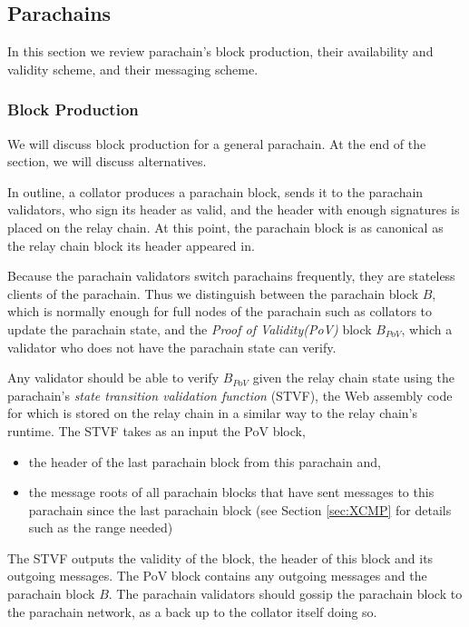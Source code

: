 \subsection{Parachains}\label{sec:parachains}
In this section we review parachain's block production, their availability and validity scheme, and their messaging scheme.
\subsubsection{Block Production}\label{sec:parachainblockproduction}

We will discuss block production for a general parachain. At the end of the section, we will discuss alternatives.

In outline, a collator produces a parachain block, sends it to the parachain validators,
who sign its header as valid, and the header with enough signatures is placed on the relay chain.
At this point, the parachain block is as canonical as the relay chain block its header appeared in.

Because the parachain validators switch parachains frequently, they are stateless clients of the parachain.
Thus we distinguish between the parachain block $B$, which is normally enough for full nodes of the parachain such as collators to update the parachain state,
and the {\em Proof of Validity(PoV)} block $B_{PoV}$, which a validator who does not have the parachain state can verify.

Any validator should be able to verify $B_{PoV}$ given the relay chain state using the parachain's {\em state transition validation function} (STVF),
the Web assembly code for which is stored on the relay chain in a similar way to the relay chain's runtime.
The STVF takes as an input the PoV block,
\begin{itemize}
	\item  the header of the last parachain block from this parachain and,
	\item the message roots of all parachain blocks that have sent messages to this parachain since the last parachain block
	(see Section \ref{sec:XCMP} for details such as the range needed)
\end{itemize}
The STVF outputs the validity of the block, the header of this block and its outgoing messages.
The PoV block contains any outgoing messages and the parachain block $B$. The parachain validators should gossip the parachain block to the parachain network, as a back up to the collator itself doing so.

